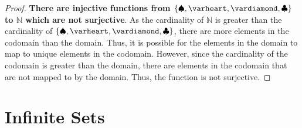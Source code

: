 \documentclass[article, 12pt]{article}
\theoremstyle{definition}
\DeclarePairedDelimiter\set{\{}{\}}
\newcommand{\nats}{\mathbb{N}}
\newcommand{\clubs}{\clubsuit}
\newcommand{\diamonds}{\vardiamond}
\newcommand{\hearts}{\varheart}
\newcommand{\spades}{\spadesuit}
\begin{document}
\begin{enumerate}[(1)]
\begin{enumerate}[(a)]
            \begin{proof}
                \textbf{There are injective functions from $\set*{\spades, \hearts, \diamonds, \clubs}$ to $\nats$ which are not surjective}. As the cardinality of $\nats$ is greater than the cardinality of $\set*{\spades, \hearts, \diamonds, \clubs}$, there are more elements in the codomain than the domain. Thus, it is possible for the elements in the domain to map to unique elements in the codomain. However, since the cardinality of the codomain is greater than the domain, there are elements in the codomain that are not mapped to by the domain. Thus, the function is not surjective.
            \end{proof}
            \end{enumerate}
        \end{enumerate}
    \section{Infinite Sets}
\end{document}
